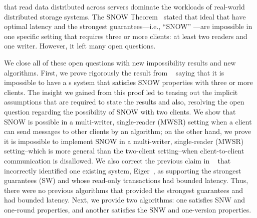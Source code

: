 {\color{blue}
\rots{} that read data distributed across servers dominate the workloads of real-world distributed storage systems.
The SNOW Theorem~\cite{SNOW2016} stated that ideal \rots{} that have optimal latency and the strongest guarantees---i.e., ``SNOW'' \rots{}---are impossible in one specific setting that requires three or more clients: at least two readers and one writer. However, it left many open questions.

We close all of these open questions with new impossibility results and new algorithms.
First, we prove rigorously the result from ~\cite{SNOW2016} saying that it is impossible to have a \rot{}s system that satisfies SNOW properties with three or more clients.
The insight we gained from this proof led to teasing out the implicit assumptions that are required to state the results and also, resolving the open question regarding the possibility of SNOW with two clients.
We show that SNOW  is possible in a multi-writer, single-reader (MWSR) setting when a client can send messages to other clients by an algorithm;
on the other hand, we prove it is impossible to implement SNOW in a multi-writer, single-reader (MWSR) setting--which is more general than the two-client setting--when client-to-client communication is disallowed.
We also correct the previous claim in ~\cite{SNOW2016} that incorrectly identified one existing system, Eiger~\cite{Lloyd:nsdi2013}, as supporting the strongest guarantees (SW) and whose read-only transactions had bounded latency. Thus, there were no previous algorithms that provided the strongest guarantees and had bounded latency. Next, we provide two algorithms: one satisfies SNW and one-round properties, and another satisfies the SNW and one-version properties.
}





